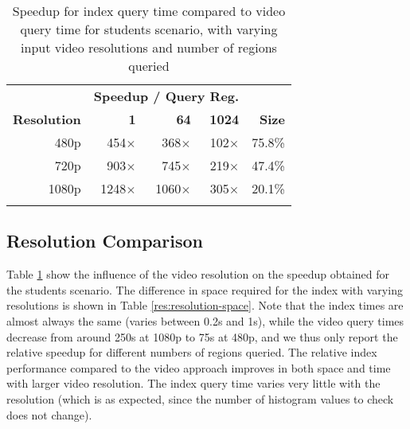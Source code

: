 \begin{table}[t]
    \caption{Speedup for index query time compared to video query time for students scenario, with varying input video resolutions and number of regions queried}\label{res:resolution-comparison}	
	\centering
    \begin{tabular}{r rrrr}
        ~ & \multicolumn{3}{c}{\textbf{Speedup / Query Reg.}} \\
		\cline{2-4}
	    \textbf{Resolution} & \textbf{1} & \textbf{64} & \textbf{1024} & \textbf{Size} \\  \hline\noalign{\smallskip}
	    480p            &  454$\times$            & 368$\times$            & 102$\times$    & 75.8\%             \\
	    720p            &  903$\times$            & 745$\times$            & 219$\times$    & 47.4\%              \\
	    1080p           & 1248$\times$            &1060$\times$            & 305$\times$    & 20.1\%              \\\noalign{\smallskip}
        \hline
	   \end{tabular}
\end{table}

\subsection{Resolution Comparison}
Table \ref{res:resolution-comparison} show the influence of the video resolution on the speedup obtained for the students scenario. The difference in space required for the index with varying resolutions is shown in Table \ref{res:resolution-space}. Note that the index times are almost always the same (varies between 0.2s and 1s), while the video query times decrease from around 250s at 1080p to 75s at 480p, and we thus only report the relative speedup for different numbers of regions queried. The relative index performance compared to the video approach improves in both space and time with larger video resolution. The index query time varies very little with the resolution (which is as expected, since the number of histogram values to check does not change).


